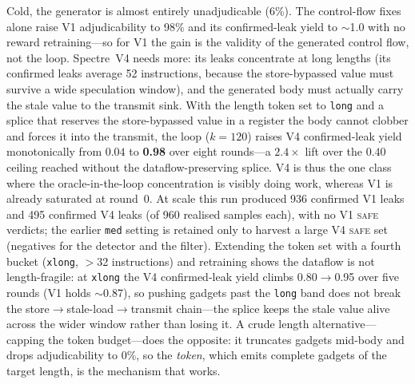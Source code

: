 \documentclass[conference]{IEEEtran}
\begin{document}
Cold, the generator is almost entirely unadjudicable (6\%). The control-flow
fixes alone raise V1 adjudicability to 98\% and its confirmed-leak yield to
$\sim$1.0 with no reward retraining---so for V1 the gain is the validity of the
generated control flow, not the loop. Spectre~V4 needs more: its leaks
concentrate at long lengths (its confirmed leaks average 52 instructions,
because the store-bypassed value must survive a wide speculation window), and
the generated body must actually carry the stale value to the transmit sink.
With the length token set to \texttt{long} and a splice that reserves the
store-bypassed value in a register the body cannot clobber and forces it into
the transmit, the loop ($k{=}120$) raises V4 confirmed-leak yield monotonically
from $0.04$ to \textbf{0.98} over eight rounds---a $2.4\times$ lift over the
$0.40$ ceiling reached without the dataflow-preserving splice. V4 is thus the
one class where the oracle-in-the-loop concentration is visibly doing work,
whereas V1 is already saturated at round~0. At scale this run produced 936
confirmed V1 leaks and 495 confirmed V4 leaks (of 960 realised samples each),
with no V1 \textsc{safe} verdicts; the earlier \texttt{med} setting is retained
only to harvest a large V4 \textsc{safe} set (negatives for the detector and
the filter). Extending the token set with a fourth bucket (\texttt{xlong},
$>$32 instructions) and retraining shows the dataflow is not length-fragile:
at \texttt{xlong} the V4 confirmed-leak yield climbs 0.80$\to$0.95 over five
rounds (V1 holds $\sim$0.87), so pushing gadgets past the \texttt{long} band
does not break the store$\to$stale-load$\to$transmit chain---the splice keeps
the stale value alive across the wider window rather than losing it. A crude length alternative---capping the token budget---does the
opposite: it truncates gadgets mid-body and drops adjudicability to 0\%, so the
\emph{token}, which emits complete gadgets of the target length, is the
mechanism that works.
\end{document}

